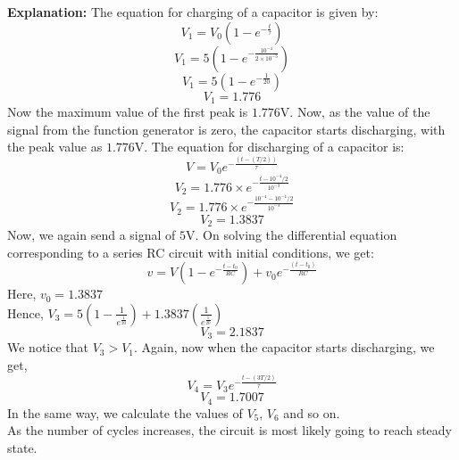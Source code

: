 \documentclass[a4paper,12pt]{article}
\begin{document}
\textbf{Explanation:}
The equation for charging of a capacitor is given by:
$$V_1=V_0(1-e^{-\frac{t}{\tau}})$$
$$V_1=5(1-e^{-\frac{10^{-4}}{2\times 10^{-3}}})$$
$$V_1=5(1-e^{-\frac{1}{20}})$$
$$V_1=1.776$$
Now the maximum value of the first peak is $1.776$V. 
Now, as the value of the signal from the function generator is zero, the capacitor starts discharging, with the peak value as $1.776$V.
The equation for discharging of a capacitor is:
$$V=V_0e^{-\frac{(t-(T/2))}{\tau}}$$
$$V_2=1.776 \times e^{-\frac{t-10^{-4}/2}{10^{-3}}}$$
$$V_2=1.776 \times e^{-\frac{10^{-4}-10^{-4}/2}{10^{-3}}}$$
$$V_2=1.3837$$
Now, we again send a signal of $5$V.
On solving the differential equation corresponding to a series RC circuit with initial conditions, we get:\\
$$v=V(1-e^{-\frac{t-t_0}{RC}})+v_0e^{-\frac{(t-t_0)}{RC}}$$
Here, $v_0=1.3837$\\
Hence, 
$V_3=5(1-\frac{1}{e^{\frac{1}{20}}})+1.3837(\frac{1}{e^{\frac{1}{20}}})$
$$V_3=2.1837$$
We notice that $V_3 > V_1$.
Again, now when the capacitor starts discharging, we get,
$$V_4=V_3e^{-\frac{t-(3T/2)}{\tau}}$$
$$V_4=1.7007$$
In the same way, we calculate the values of $V_5$, $V_6$ and so on.\\
As the number of cycles increases, the circuit is most likely going to reach steady state.
\end{document}
